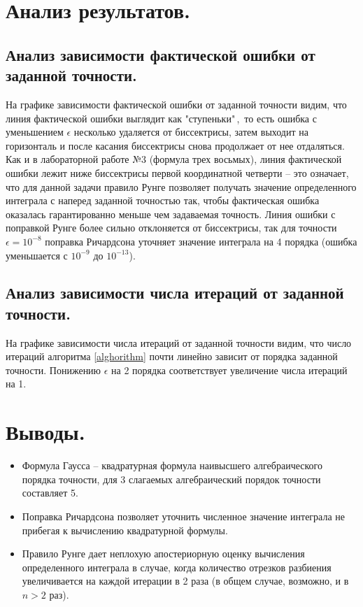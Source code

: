 \documentclass[a4paper, 12pt]{article}
\begin{document}
	\section{Анализ результатов.}
	
	\subsection{Анализ зависимости фактической ошибки от заданной точности.} 
	
	На графике зависимости фактической ошибки от заданной точности видим, что линия фактической ошибки выглядит как "ступеньки"\,,\ то есть ошибка с уменьшением $\epsilon$ несколько удаляется от биссектрисы, затем выходит на горизонталь и после касания биссектрисы снова продолжает от нее отдаляться. Как и в лабораторной работе №3 (формула трех восьмых), линия фактической ошибки лежит ниже биссектрисы первой координатной четверти -- это означает, что для данной задачи правило Рунге позволяет получать значение определенного интеграла с наперед заданной точностью так, чтобы фактическая ошибка оказалась гарантированно меньше чем задаваемая точность. Линия ошибки с поправкой Рунге более сильно отклоняется от биссектрисы, так для точности $\epsilon=10^{-8}$ поправка Ричардсона уточняет значение интеграла на 4 порядка (ошибка уменьшается с $10^{-9}$ до $10^{-13}$). 
	
	\subsection{Анализ зависимости числа итераций от заданной точности.}
	
	На графике зависимости числа итераций от заданной точности видим, что число итераций алгоритма \ref{alghorithm} почти линейно зависит от порядка заданной точности. Понижению $\epsilon$ на 2 порядка соответствует увеличение числа итераций на 1.
	
	\section{Выводы.}
	
	\begin{itemize}
		\item Формула Гаусса -- квадратурная формула наивысшего алгебраического порядка точности, для 3 слагаемых алгебраический порядок точности составляет 5.
		\item Поправка Ричардсона позволяет уточнить численное значение интеграла не прибегая к вычислению квадратурной формулы.
		\item Правило Рунге дает неплохую апостериорную оценку вычисления определенного интеграла в случае, когда количество отрезков разбиения увеличивается на каждой итерации в 2 раза (в общем случае, возможно, и в $n>2$ раз).
	\end{itemize}
	
\end{document}
